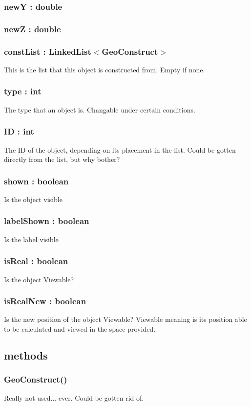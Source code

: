 \documentclass[a4paper,10pt]{report}
\begin{document}
\subsubsection{newY : double}
\subsubsection{newZ : double}
\subsubsection{constList : LinkedList$<$GeoConstruct$>$ }  This is the list that this object is constructed from.  Empty if none.
\subsubsection{type : int} The type that an object is. Changable under certain conditions.
\subsubsection{ID : int}  The ID of the object, depending on its placement in the list.  Could be gotten directly from the list, but why bother?
\subsubsection{shown : boolean} Is the object visible
\subsubsection{labelShown : boolean} Is the label visible
\subsubsection{isReal : boolean} Is the object Viewable?
\subsubsection{isRealNew : boolean} Is the new position of the object Viewable? Viewable meaning is its position able to be calculated and viewed in the space provided.
 \subsection{methods}
\subsubsection{GeoConstruct()} Really not used... ever.  Could be gotten rid of.
\end{document}
